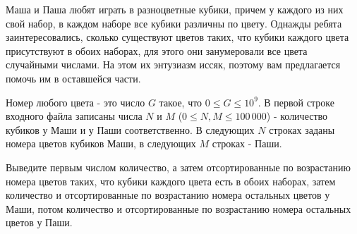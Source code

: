 Маша и Паша любят играть в разноцветные кубики, причем у каждого из них свой набор, в каждом наборе все кубики различны по цвету. Однажды ребята заинтересовались, сколько существуют цветов таких, что кубики каждого цвета присутствуют в обоих наборах, для этого они занумеровали все цвета случайными числами. На этом их энтузиазм иссяк, поэтому вам предлагается помочь им в оставшейся части.

\InputFile
Номер любого цвета - это число $G$ такое, что $0 \leqslant G \leqslant 10^9$. В первой строке входного файла записаны числа $N$ и $M$ ($0 \leqslant N, M \leqslant 100\,000$) - количество кубиков у Маши и у Паши соответственно. В следующих $N$ строках заданы номера цветов кубиков Маши, в следующих $M$ строках - Паши.

\OutputFile
Выведите первым числом количество, а затем отсортированные по возрастанию номера цветов таких, что кубики каждого цвета есть в обоих наборах, затем количество и отсортированные по возрастанию номера остальных цветов у Маши, потом количество и отсортированные по возрастанию номера остальных цветов у Паши.